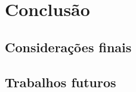 
\chapter{Conclusão}\label{chap:conclusão}

\lipsum[1]

\section{Considerações finais}

\lipsum[1]

\section{Trabalhos futuros}

\lipsum[1]
